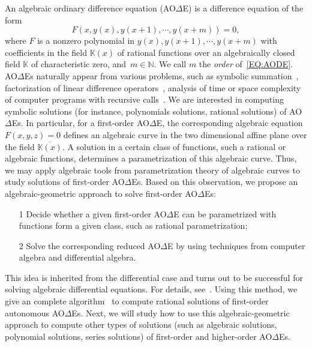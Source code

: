 \documentclass[10pt,a4paper]{article}
\newcommand{\bN}{ {\mathbb  N}}
\newcommand{\bK}{ {\mathbb  K}}
\newcommand{\red}{\color{red}}
\newcommand{\AODE}{{AO{$\Delta$}E}}
\begin{document}
An algebraic ordinary difference equation (\AODE) is a difference equation of the form
\begin{equation} \label{EQ:AODE}
F(x, y(x), y(x + 1), \cdots, y(x + m))=0,
\end{equation}
where $F$ is a nonzero polynomial in $y(x), y(x + 1), \cdots, y(x + m)$ with coefficients in the field $\bK(x)$ of rational functions over an algebraically closed field $\bK$ 
of characteristic zero, and~$m \in \bN$. We call $m$ the \emph{order} of~\eqref{EQ:AODE}. 
{\AODE}s naturally appear from various problems, such as symbolic summation~\cite{PWZbook1996, KoutschanThesis}, 
factorization of linear difference operators~\cite{BronsteinPetkovsek1996}, 
analysis of time or space complexity of computer programs with recursive calls~\cite{Eekelen2018}. 
We are interested in computing symbolic solutions (for instance, polynomials solutions, rational solutions) of {\AODE}s.
In particular, for a first-order {\AODE}, the corresponding algebraic equation $F(x, y, z) = 0$ defines an algebraic curve in the two dimensional affine plane 
over the field $\overline{\mathbb{K}(x)}$. A solution in a certain class of
functions, such a rational or algebraic functions, determines a parametrization of this algebraic curve. 
Thus, we may apply algebraic tools from parametrization theory of algebraic curves to study solutions of first-order {\AODE}s. 
Based on this observation, we propose an algebraic-geometric approach to solve first-order {\AODE}s: 
\begin{itemize}
 \item [1] Decide whether a given first-order {\AODE} can be parametrized with functions form a given class, 
such as rational parametrization;
 \item [2] Solve the corresponding reduced {\AODE} by using techniques from computer algebra 
and differential algebra.
\end{itemize}
This idea is inherited from the differential case and turns out to be successful for solving algebraic 
differential equations. For details, see~\cite{Winkler2019}. 
Using this method, we give an complete algorithm~\cite{VoZhang2019} to compute rational solutions of first-order autonomous {\AODE}s. 
Next, we will study how to use this algebraic-geometric approach to compute other types of solutions 
(such as algebraic solutions, polynomial solutions, series solutions) of first-order and higher-order {\AODE}s. 
\end{document}
